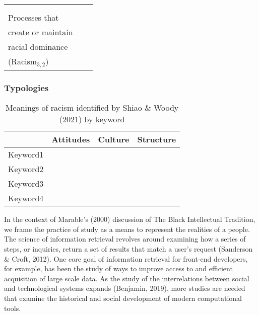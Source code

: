 \begin{landscape}
\begin{table}[h]
\begin{tabular}{lll}
                   &                          &                                         \\
                   &                          &                                         \\
      \hspace{.5cm} Processes that               &                          &   \\
            \hspace{.5cm} create or maintain              &                          &   \\
                  \hspace{.5cm} racial dominance              &                          &   \\
                        \hspace{.5cm}  (Racism$_{3,2}$)                 &                          &   \\
                  \bottomrule                                     
\end{tabular}
\end{table}
\end{landscape}
\subsubsection{Typologies}

\begin{table}[h]
\centering
\caption{Meanings of racism identified by Shiao \& Woody (2021) by keyword}
\label{tab:keyword}
\begin{tabular}{llll}
\toprule
         & Attitudes & Culture & Structure \\
         \midrule
Keyword1 &           &         &           \\
Keyword2 &           &         &           \\
Keyword3 &           &         &           \\
Keyword4 &           &         &         \\
\bottomrule 
\end{tabular}
\end{table}

\newpage

In the context of Marable's (2000) discussion of The Black Intellectual Tradition, we frame the practice of study as a means to represent the realities of a people. The science of information retrieval revolves around examining how a series of steps, or inquiries, return a set of results that match a user's request (Sanderson \& Croft, 2012). One core goal of information retrieval for front-end developers, for example, has been the study of ways to improve access to and efficient acquisition of large scale data. As the study of the interrelations between social and technological systems expands (Benjamin, 2019), more studies are needed that examine the historical and social development of modern computational tools.


